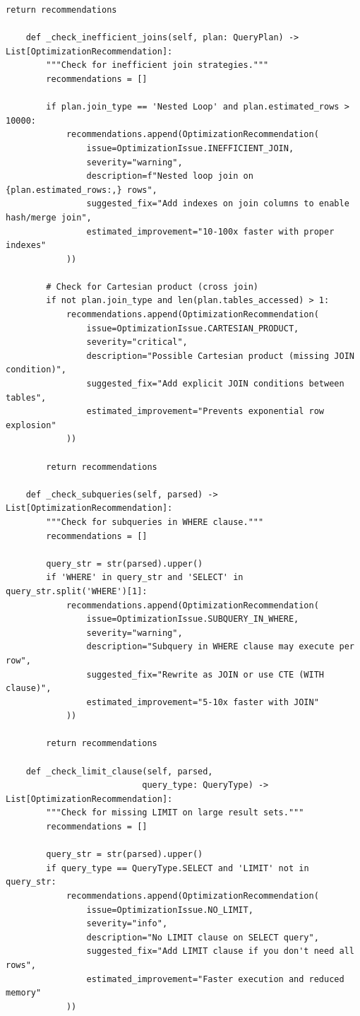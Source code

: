 \begin{lstlisting}[style=python, caption=QueryOptimizer with Cost-Based Analysis]
        return recommendations

    def _check_inefficient_joins(self, plan: QueryPlan) -> List[OptimizationRecommendation]:
        """Check for inefficient join strategies."""
        recommendations = []

        if plan.join_type == 'Nested Loop' and plan.estimated_rows > 10000:
            recommendations.append(OptimizationRecommendation(
                issue=OptimizationIssue.INEFFICIENT_JOIN,
                severity="warning",
                description=f"Nested loop join on {plan.estimated_rows:,} rows",
                suggested_fix="Add indexes on join columns to enable hash/merge join",
                estimated_improvement="10-100x faster with proper indexes"
            ))

        # Check for Cartesian product (cross join)
        if not plan.join_type and len(plan.tables_accessed) > 1:
            recommendations.append(OptimizationRecommendation(
                issue=OptimizationIssue.CARTESIAN_PRODUCT,
                severity="critical",
                description="Possible Cartesian product (missing JOIN condition)",
                suggested_fix="Add explicit JOIN conditions between tables",
                estimated_improvement="Prevents exponential row explosion"
            ))

        return recommendations

    def _check_subqueries(self, parsed) -> List[OptimizationRecommendation]:
        """Check for subqueries in WHERE clause."""
        recommendations = []

        query_str = str(parsed).upper()
        if 'WHERE' in query_str and 'SELECT' in query_str.split('WHERE')[1]:
            recommendations.append(OptimizationRecommendation(
                issue=OptimizationIssue.SUBQUERY_IN_WHERE,
                severity="warning",
                description="Subquery in WHERE clause may execute per row",
                suggested_fix="Rewrite as JOIN or use CTE (WITH clause)",
                estimated_improvement="5-10x faster with JOIN"
            ))

        return recommendations

    def _check_limit_clause(self, parsed,
                           query_type: QueryType) -> List[OptimizationRecommendation]:
        """Check for missing LIMIT on large result sets."""
        recommendations = []

        query_str = str(parsed).upper()
        if query_type == QueryType.SELECT and 'LIMIT' not in query_str:
            recommendations.append(OptimizationRecommendation(
                issue=OptimizationIssue.NO_LIMIT,
                severity="info",
                description="No LIMIT clause on SELECT query",
                suggested_fix="Add LIMIT clause if you don't need all rows",
                estimated_improvement="Faster execution and reduced memory"
            ))


\end{lstlisting}
